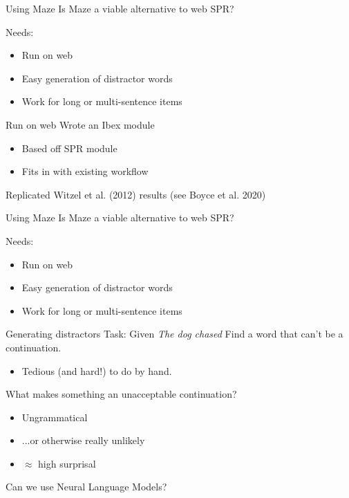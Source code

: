 \documentclass[12pt, xcolor=beamer,table,usenames,dvipsnames, ignorenonframetext, ngerman]{beamer}
\begin{document}
\begin{frame}{Using Maze}
Is Maze a viable alternative to web SPR?

Needs:
\begin{itemize}
	\item Run on web 
	\item Easy generation of distractor words
	\item Work for long or multi-sentence items %
\end{itemize} 
\pause

\end{frame}

\begin{frame}{Run on web}
	Wrote an Ibex module
	\begin{itemize}
		\item Based off SPR module
		\item Fits in with existing workflow
	\end{itemize}
 Replicated Witzel et al. (2012) results (see Boyce et al. 2020)
\end{frame}
%
\begin{frame}{Using Maze}
	Is Maze a viable alternative to web SPR?
	
	Needs:
	\begin{itemize}
		\item Run on web 
		\item Easy generation of distractor words
		\item Work for long or multi-sentence items %
	\end{itemize} 
	\pause
	
\end{frame}
%
\begin{frame}{Generating distractors}
\pause
Task: Given  \textit{The dog chased} Find a word that can't be a continuation.
\begin{itemize}
	\item Tedious (and hard!) to do by hand. 
\end{itemize}

What makes something an unacceptable continuation?
\begin{itemize}
	\item Ungrammatical
	\item ...or otherwise really unlikely 
	\item $\approx$ high surprisal 
\end{itemize}

Can we use Neural Language Models?
\end{frame}
\end{document}
